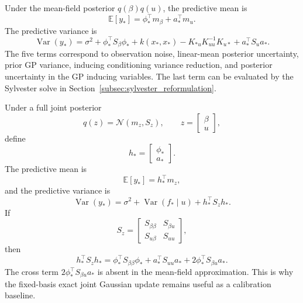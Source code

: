 \documentclass[12pt]{article}
\newcommand{\E}{\mathbb{E}}
\newcommand{\Var}{\operatorname{Var}}
\begin{document}
Under the mean-field posterior \(q(\beta)q(u)\), the predictive mean is
\begin{equation}
    \E[y_*]
    =
    \phi_*^\top m_\beta
    +
    a_*^\top m_u .
\end{equation}
The predictive variance is
\begin{equation}
    \Var(y_*)
    =
    \sigma^2
    +
    \phi_*^\top S_\beta\phi_*
    +
    k(x_*,x_*)
    -
    K_{*u}K_{uu}^{-1}K_{u*}
    +
    a_*^\top S_ua_* .
    \label{eq:mean_field_predictive_variance}
\end{equation}
The five terms correspond to observation noise, linear-mean posterior uncertainty, prior
GP variance, inducing conditioning variance reduction, and posterior uncertainty in the
GP inducing variables. The last term can be evaluated by the Sylvester solve in
Section~\ref{subsec:sylvester_reformulation}.

Under a full joint posterior
\begin{equation}
    q(z)
    =
    \mathcal{N}(m_z,S_z),
    \qquad
    z=
    \begin{bmatrix}
        \beta\\
        u
    \end{bmatrix},
\end{equation}
define
\begin{equation}
    h_*=
    \begin{bmatrix}
        \phi_*\\
        a_*
    \end{bmatrix}.
\end{equation}
The predictive mean is
\begin{equation}
    \E[y_*]=h_*^\top m_z,
\end{equation}
and the predictive variance is
\begin{equation}
    \Var(y_*)
    =
    \sigma^2
    +
    \Var(f_*\mid u)
    +
    h_*^\top S_zh_* .
\end{equation}
If
\begin{equation}
    S_z=
    \begin{bmatrix}
        S_{\beta\beta} & S_{\beta u}\\
        S_{u\beta} & S_{uu}
    \end{bmatrix},
\end{equation}
then
\begin{equation}
    h_*^\top S_zh_*
    =
    \phi_*^\top S_{\beta\beta}\phi_*
    +
    a_*^\top S_{uu}a_*
    +
    2\phi_*^\top S_{\beta u}a_* .
\end{equation}
The cross term \(2\phi_*^\top S_{\beta u}a_*\) is absent in the mean-field
approximation. This is why the fixed-basis exact joint Gaussian update remains useful as
a calibration baseline.
\end{document}
